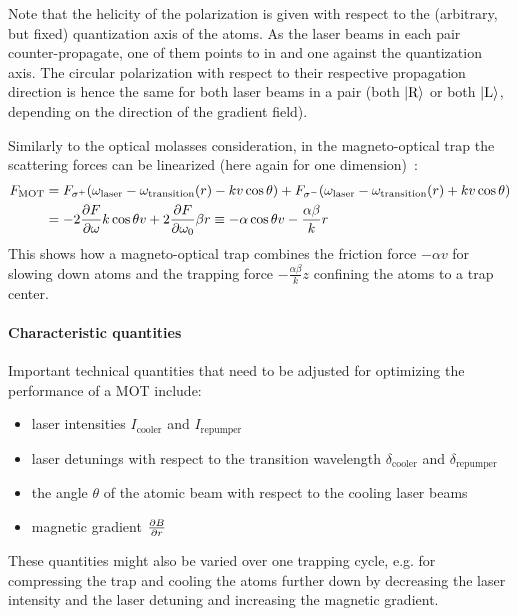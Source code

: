 Note that the helicity of the polarization is given with respect to the (arbitrary, but fixed) quantization axis of the atoms. As the laser beams in each pair counter-propagate, one of them points to in and one against the quantization axis. The circular polarization with respect to their respective propagation direction is hence the same for both laser beams in a pair (both $\Ket{\text{R}}$ or both $\Ket{\text{L}}$, depending on the direction of the gradient field).


Similarly to the optical molasses consideration, in the magneto-optical trap the scattering forces can be linearized  (here again for one dimension)~\cite{foot_atomic_2005}:
\begin{equation}
    \begin{split}
        F_\text{MOT} &= F_{\sigma^+}(\omega_\text{laser} - \omega_\text{transition}(r) - kv \cos \theta) + F_{\sigma^-}(\omega_\text{laser} - \omega_\text{transition}(r) + kv \cos \theta)\\
        &= -2 \pdv{F}{\omega} k\cos \theta v + 2 \pdv{F}{\omega_0} \beta r  \equiv - \alpha \cos \theta v - \frac{\alpha \beta}{k} r
    \end{split}
\end{equation}
This shows how a magneto-optical trap combines the friction force $- \alpha v$ for slowing down atoms and the trapping force $- \frac{\alpha \beta}{k} z$ confining the atoms to a trap center.


\paragraph{Characteristic quantities}
Important technical quantities that need to be adjusted for optimizing the performance of a MOT include:
\begin{itemize}
    \item laser intensities $I_\text{cooler}$ and $I_\text{repumper}$
    \item laser detunings with respect to the transition wavelength $\delta_\text{cooler}$ and $\delta_\text{repumper}$
    \item the angle $\theta$ of the atomic beam with respect to the cooling laser beams
    \item magnetic gradient $\pdv{B}{r}$
\end{itemize}

These quantities might also be varied over one trapping cycle, e.g. for compressing the trap and cooling the atoms further down by decreasing the laser intensity and the laser detuning and increasing the magnetic gradient.

